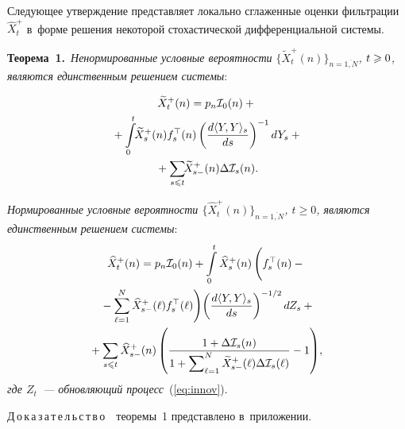 \begin{multicols}{2}
  Следующее утверждение представляет локально сглаженные оценки 
  фильтрации~$\widehat{X}^+_t$ в~форме решения некоторой стохастической 
  дифференциальной системы.
  
  \smallskip
  
  \noindent
  \textbf{Теорема~1.}\
\textit{Ненормированные условные вероятности
$\{\widetilde{X}_t^+(n)\}_{n=\overline{1,N}}$, $t \hm\geqslant 0$, являются 
единственным решением системы}:

\noindent
 \begin{multline}
  \widetilde{X}_t^+(n) = p_n\mathcal{I}_{0}(n) + {}\\
  {}+\int\limits_0^t \!\!\widetilde{X}_{s}^+(n) f_s^{\top}(n)\left(  
  \displaystyle\frac{\displaystyle d\langle Y,Y\rangle_s\mathstrut}{\displaystyle ds\mathstrut}\right)^{-1}dY_s +{}\\
  {}+
  \sum_{s \leqslant t} \!\!\widetilde{X}_{s-}^+(n)\Delta\mathcal{I}_{s}(n).
   \label{eq:dif_class_unnorm}
  \end{multline}

  \textit{Нормированные условные вероятности 
  $\{\widehat{X}_t^+(n)\}_{n=\overline{1,N}}$, $t \geqslant 0$, 
  являются единственным решением системы}:
  \begin{multline}
  \widehat{X}_t^+(n) = p_n\mathcal{I}_{0}(n) +
  \int\limits_0^t \widehat{X}_{s}^+(n)\left(
  \vphantom{\sum\limits_{\ell=1}^N}
  f_s^{\top}(n) -{}\right.\\
\left.  {}- \sum\limits_{\ell=1}^N \widehat{X}_{s-}^+(\ell)
f_s^{\top}(\ell)
  \right)\!\left( \fr{d\langle Y,Y\rangle_s}{ds}\right)^{-1/2}dZ_s+{} \\
\hspace*{-2mm}{}  + \sum\limits_{s \leqslant t} \widehat{X}^+_{s-}(n)
  \left(
  \fr{1+\Delta\mathcal{I}_{s}(n)}{1+\sum\nolimits_{\ell=1}^N 
  \widetilde{X}_{s-}^+(\ell)\Delta\mathcal{I}_{s}(\ell)} - 1
  \right)\!,\!\!
  \label{eq:dif_class_norm}
  \end{multline}
  \textit{где $Z_t$~--- обновляющий процесс}~(\ref{eq:innov}).
  
  \smallskip


\noindent
 Д\,о\,к\,а\,з\,а\,т\,е\,л\,ь\,с\,т\,в\,о\ \ 
 теоремы~1 представлено в~приложении.


\end{multicols}
